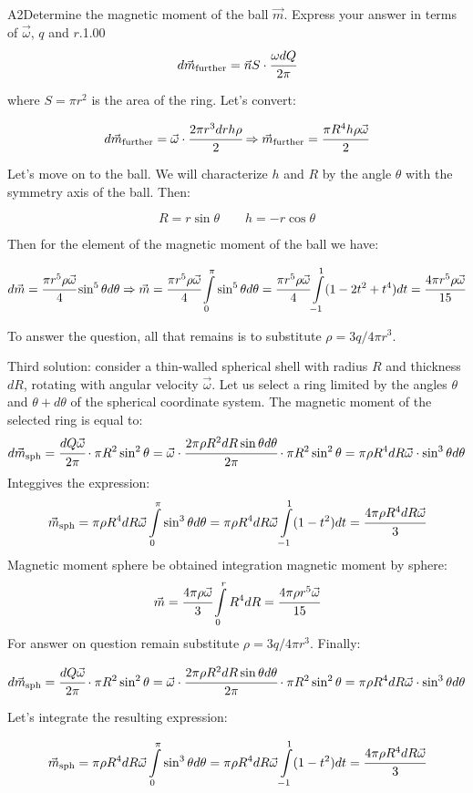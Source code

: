 \documentclass[11pt,a4paper]{article}
\begin{document}
\begin{solcard}{A2}{Determine the magnetic moment of the ball $\vec{m}$. Express your answer in terms of $\vec{\omega}$, $q$ and $r$.}{1.00}
$$d\vec{m}_\text{further}=\vec{n}S\cdot\cfrac{\omega dQ}{2\pi} $$


where $S=\pi{r}^2$ is the area of the ring. Let's convert:


$$d\vec{m}_{\text{further}}=\vec{\omega}\cdot\cfrac{2\pi{r}^3drh\rho}{2}\Rightarrow{\vec{m}_\text{further}=\cfrac{\pi{R}^4h\rho\vec{\omega}}{2}} $$


Let's move on to the ball. We will characterize $h$ and $R$ by the angle $\theta$ with the symmetry axis of the ball. Then:


$$R=r\sin\theta\qquad h=-r\cos\theta $$


Then for the element of the magnetic moment of the ball we have:


$$d\vec{m}=\cfrac{\pi{r}^5\rho\vec{\omega}}{4}\sin^5\theta d\theta\Rightarrow{\vec{m}=\cfrac{\pi{r}^5\rho\vec{\omega}}{4}\int\limits_0^{\pi}\sin^5\theta d\theta}=\cfrac{\pi{r}^5\rho\vec{\omega}}{4}\int\limits_{-1}^{1}(1-2t^2+t^4)dt=\cfrac{4\pi{r}^5\rho\vec{\omega}}{15} $$


To answer the question, all that remains is to substitute $\rho=3q/4\pi{r}^3$.


Third solution: consider a thin-walled spherical shell with radius $R$ and thickness $dR$, rotating with angular velocity $\vec{\omega}$. Let us select a ring limited by the angles $\theta$ and $\theta+d\theta$ of the spherical coordinate system. The magnetic moment of the selected ring is equal to: $$d\vec{m}_\text{sph}=\cfrac{dQ\vec{\omega}}{2\pi}\cdot \pi{R}^2\sin^2\theta=\vec{\omega}\cdot\cfrac{2\pi\rho R^2dR\sin\theta d\theta}{2\pi}\cdot\pi{R}^2\sin^2\theta=\pi\rho{R}^4dR\vec{\omega}\cdot\sin^3\theta d\theta $$ Integgives the expression: $$\vec{m}_\text{sph}=\pi\rho{R}^4dR\vec{\omega}\int\limits_0^{\pi}\sin^3\theta d\theta=\pi\rho{R}^4dR\vec{\omega}\int\limits_{-1}^{1}(1-t^2)dt=\cfrac{4\pi\rho R^4dR\vec{\omega}}{3} $$ Magnetic moment sphere be obtained integration magnetic moment by sphere: $$\vec{m}=\cfrac{4\pi\rho\vec{\omega}}{3}\int\limits_{0}^rR^4dR=\cfrac{4\pi\rho{r}^5\vec{\omega}}{15} $$ For answer on question remain substitute $\rho=3q/4\pi{r}^3$. Finally:


$$d\vec{m}_\text{sph}=\cfrac{dQ\vec{\omega}}{2\pi}\cdot \pi{R}^2\sin^2\theta=\vec{\omega}\cdot\cfrac{2\pi\rho R^2dR\sin\theta d\theta}{2\pi}\cdot\pi{R}^2\sin^2\theta=\pi\rho{R}^4dR\vec{\omega}\cdot\sin^3\theta d\theta $$


Let's integrate the resulting expression:


$$\vec{m}_\text{sph}=\pi\rho{R}^4dR\vec{\omega}\int\limits_0^{\pi}\sin^3\theta d\theta=\pi\rho{R}^4dR\vec{\omega}\int\limits_{-1}^{1}(1-t^2)dt=\cfrac{4\pi\rho R^4dR\vec{\omega}}{3} $$



\end{solcard}
\end{document}
